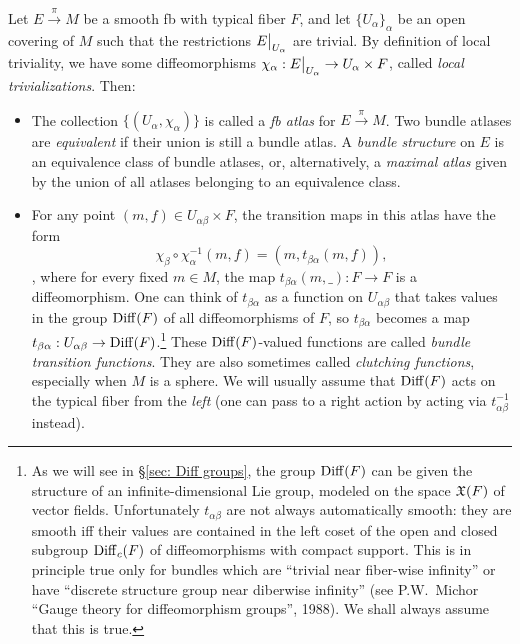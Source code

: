 \begin{defn}
    Let $E\overset{\pi}{\to}M$ be a smooth \gls{fb} with typical fiber $F$, and let $\{U_\alpha\}_\alpha$ be an open covering of $M$ such that the restrictions $\restr{E}{U_\alpha}$ are trivial. By definition of local triviality, we have some diffeomorphisms $\chi_\alpha: \restr{E}{U_\alpha}\to U_\alpha\times F$, called \emph{local trivializations}. Then:
\begin{itemize}

    \item The collection $\{(U_\alpha,\chi_\alpha)\}$ is called a \emph{\gls{fb} atlas} for $E\overset{\pi}{\to}M$. Two bundle atlases are \emph{equivalent} if their union is still a bundle atlas. A \emph{bundle structure} on $E$ is an equivalence class of bundle atlases, or, alternatively, a \emph{maximal atlas} given by the union of all atlases belonging to an equivalence class.
    
    \item For any point $(m,f)\in U_{\alpha\beta}\times F$, the transition maps in this atlas have the form \[\chi_\beta\circ\chi_\alpha^{-1} (m,f)=(m, t_{\beta\alpha}(m,f)),\label{eq transition functions}\], 
    where for every fixed $m\in M$, the map $t_{\beta\alpha}(m,\_):F\to F$ is a diffeomorphism. One can think of $t_{\beta\alpha}$ as a function on $U_{\alpha\beta}$ that takes values in the group $\operatorname{Diff}(F)$ of all diffeomorphisms of $F$, so $t_{\beta\alpha}$ becomes a map $t_{\beta\alpha}:U_{\alpha\beta}\to \operatorname{Diff}(F)$.\footnote{As we will see in \S\ref{sec: Diff groups}, the group $\operatorname{Diff}(F)$ can be given the structure of an infinite-dimensional Lie group, modeled on the space $\mathfrak{X}(F)$ of vector fields. Unfortunately $t_{\alpha\beta}$ are not always automatically smooth: they are smooth iff their values are contained in the left coset of the open and closed subgroup $\operatorname{Diff}_c(F)$ of diffeomorphisms with compact support. This is in principle true only for bundles which are ``trivial near fiber-wise infinity'' or have ``discrete structure group near diberwise infinity'' (see P.W.~Michor ``Gauge theory for diffeomorphism groups'', 1988). We shall always assume that this is true.}
    These $\operatorname{Diff}(F)$-valued functions are called \emph{bundle transition functions}. They are also sometimes called \emph{clutching functions}, especially when $M$ is a sphere. We will usually assume that $\operatorname{Diff}(F)$ acts on the typical fiber from the \emph{left} (one can pass to a right action by acting via $t_{\alpha\beta}^{-1}$ instead).
    

\end{itemize}
\end{defn}
